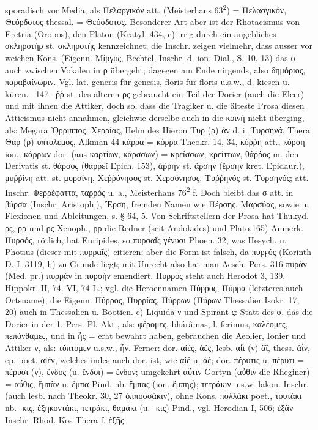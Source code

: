 sporadisch vor Media, als Πελαργικόν att. (Meisterhans 63\textsuperscript{2}) = Πελασγικόν, Θεόρδοτος thessal. = Θεόσδοτος. Besonderer Art aber ist der Rhotacismus von Eretria (Oropos), den Platon (Kratyl. 434, c) irrig durch ein angebliches σκληροτήρ st. σκληροτής kennzeichnet; die Inschr. zeigen vielmehr, dass ausser vor weichen Kons. (Eigenn. Μίργος, Bechtel, Inschr. d. ion. Dial., S. 10. 13) das σ auch zwischen Vokalen in ρ übergeht; dagegen am Ende nirgends, also δημόριος, παραβαίνωριν. Vgl. lat. generis für genesis, floris für floris u.s.w., d. kiesen u. küren. --147-- ῤῥ st. des älteren ρς gebraucht ein Teil der Dorier (auch die Eleer) und mit ihnen die Attiker, doch so, dass die Tragiker u. die älteste Prosa diesen Atticismus nicht annahmen, gleichwie derselbe auch in die κοινή nicht überging, als: Megara Ὄρριππος, Χερρίας, Helm des Hieron Τυρ (ρ) άν d. i. Τυρσηνά, Thera Θαρ (ρ) υπτόλεμος, Alkman 44 κάρρα = κόρρα Theokr. 14, 34, κόῤῥη att., κόρση ion.; κάρρων dor. (aus καρτίων, κάρσσων) = κρείσσων, κρείττων, θάῤῥος m. den Derivatis st. θάρσος (θαρρεῖ Epich. 153), ἄῤῥην st. ἄρσην (ἔρσην kret. Epidaur.), μυῤῥίνη att. st. μυρσίνη, Χεῤῥόνησος st. Χερσόνησος, Τυῤῥηνός st. Τυρσηνός; att. Inschr. Φερρέφαττα, ταρρός u. a., Meisterhans 76\textsuperscript{2} f. Doch bleibt das σ att. in βύρσα (Inschr. Aristoph.), Ἕρση, fremden Namen wie Πέρσης, Μαρσύας, sowie in Flexionen und Ableitungen, s. § 64, 5. Von Schriftstellern der Prosa hat Thukyd. ρς, ρρ und ρς Xenoph., ρρ die Redner (seit Andokides) und Plato.165) Anmerk. Πυρσός, rötlich, hat Euripides, so πυρσαῖς γένυσι Phoen. 32, was Hesych. u. Photius (dieser mit πυρραῖς) citieren; aber die Form ist falsch, da πυρϝός (Korinth D.-I. 3119, h) zu Grunde liegt; mit Unrecht also hat man Aesch. Pers. 316 πυράν (Med. pr.) πυρράν in πυρσήν emendiert. Πυρρός steht auch Herodot 3, 139, Hippokr. II, 74. VI, 74 L.; vgl. die Heroennamen Πύρρος, Πύρρα (letzteres auch Ortsname), die Eigenn. Πύρρος, Πυρρίας, Πύρρων (Πύρων Thessalier Isokr. 17, 20) auch in Thessalien u. Böotien. c) Liquida ν und Spirant ς: Statt des σ, das die Dorier in der 1. Pers. Pl. Akt., als: φέρομες, bhárâmas, l. ferimus, καλέομες, πεπόνθαμες, und in ἦς = erat bewahrt haben, gebrauchen die Aeolier, Ionier und Attiker ν, als: τύπτομεν u.s.w., ἦν. Ferner: dor. αἰές, ἀές, lesb. αἶι (ν) ἄϊ, thess. ἀΐν, ep. poet. αἰέν, welches indes auch dor. ist, wie αἰέ u. ἀέ; dor. πέρυτις u. πέρυτι = πέρυσι (ν), ἔνδος (u. ἔνδοι) = ἔνδον; umgekehrt αὖτιν Gortyn (αὖθιν die Rheginer) = αὖθις, ἔμπᾶν u. ἔμπα Pind. nb. ἔμπας (ion. ἔμπης); τετράκιν u.s.w. lakon. Inschr. (auch lesb. nach Theokr. 30, 27 ὀπποσσάκιν), ohne Kons. πολλάκι poet., τουτάκι nb. -κις, ἑξηκοντάκι, τετράκι, θαμάκι (u. -κις) Pind., vgl. Herodian I, 506; ἑξᾶν Inschr. Rhod. Kos Thera f. ἑξῆς.
